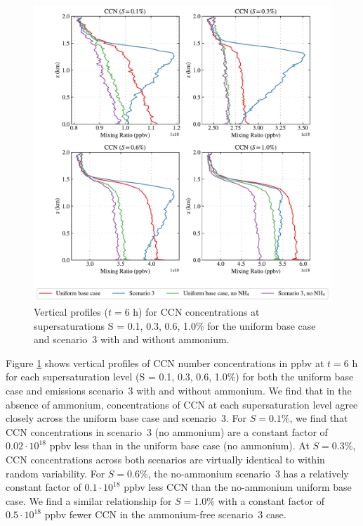 \begin{figure}[!t]
  \centering
    \includegraphics[width=\textwidth]{figures/chapter5/aerosol-ccn-vertical-profiles-no-nh4-cases-time36.pdf}
    \caption{Vertical profiles ($t = 6$ h) for CCN concentrations at supersaturations S = 0.1, 0.3, 0.6, 1.0\% for the uniform base case and scenario~3 with and without ammonium.}
    \label{fig:vert-profiles-ccn-no-nh4}
\end{figure}

Figure \ref{fig:vert-profiles-ccn-no-nh4} shows vertical profiles of CCN number concentrations in ppbv at $t=6$ h for each supersaturation level (S = 0.1, 0.3, 0.6, 1.0\%) for both the uniform base case and emissions scenario~3 with and without ammonium. We find that in the absence of ammonium, concentrations of CCN at each supersaturation level agree closely across the uniform base case and scenario~3. For $S=0.1\%$, we find that CCN concentrations in scenario~3 (no ammonium) are a constant factor of $0.02\cdot10^{18}$ ppbv less than in the uniform base case (no ammonium). At $S=0.3\%$, CCN concentrations across both scenarios are virtually identical to within random variability. For $S=0.6\%$, the no-ammonium scenario~3 has a relatively constant factor of $0.1\cdot10^{18}$ ppbv less CCN than the no-ammonium uniform base case. We find a similar relationship for $S=1.0\%$ with a constant factor of $0.5\cdot10^{18}$ ppbv fewer CCN in the ammonium-free scenario~3 case. 

